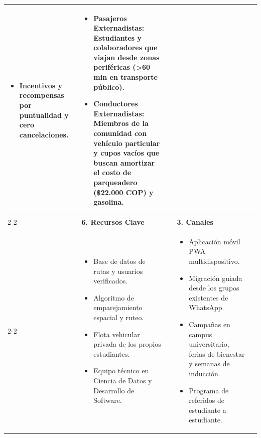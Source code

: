 \documentclass[11pt,a4paper]{article}
\begin{document}
\begin{table}[h!]
\begin{tabularx}{\linewidth}{|X|X|X|X|X|}
\begin{itemize}[leftmargin=*]
    \item Incentivos y recompensas por puntualidad y cero cancelaciones.
\end{itemize} & 
\begin{itemize}[leftmargin=*]
    \item \textbf{Pasajeros Externadistas:} Estudiantes y colaboradores que viajan desde zonas periféricas (>60 min en transporte público).
    \item \textbf{Conductores Externadistas:} Miembros de la comunidad con vehículo particular y cupos vacíos que buscan amortizar el costo de parqueadero (\$22.000 COP) y gasolina.
\end{itemize} \\
\cline{2-2} \cline{4-4}
 & \rowcolor{primary!15} 
\textbf{6. Recursos Clave} & & \rowcolor{primary!15} 
\textbf{3. Canales} & \\
\cline{2-2} \cline{4-4}
 & \begin{itemize}[leftmargin=*]
    \item Base de datos de rutas y usuarios verificados.
    \item Algoritmo de emparejamiento espacial y ruteo.
    \item Flota vehicular privada de los propios estudiantes.
    \item Equipo técnico en Ciencia de Datos y Desarrollo de Software.
\end{itemize} & & \begin{itemize}[leftmargin=*]
    \item Aplicación móvil PWA multidispositivo.
    \item Migración guiada desde los grupos existentes de WhatsApp.
    \item Campañas en campus universitario, ferias de bienestar y semanas de inducción.
    \item Programa de referidos de estudiante a estudiante.
\end{itemize} & \\
\hline
\end{tabularx}
\end{table}
\end{document}
